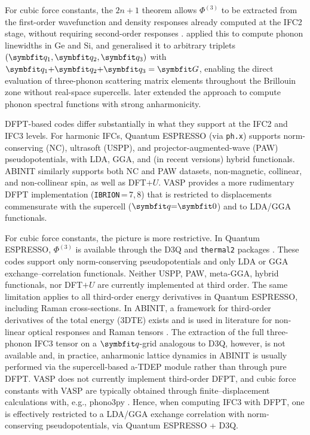 For cubic force constants, the $2n{+}1$ theorem allows $\Phi^{(3)}$
to be extracted from the first-order wavefunction and density
responses already computed at the IFC2 stage, without requiring
second-order responses \cite{debernardi_anharmonic_1995, debernardi_third-order_1994}.
\citet{deinzer_ab_2003} applied this
to compute phonon linewidths in Ge and Si, and
\citet{paulatto_anharmonic_2013} generalised it to arbitrary
triplets $(\vq_1,\vq_2,\vq_3)$ with $\vq_1{+}\vq_2{+}\vq_3 =\vc{G}$,
enabling the direct evaluation of three-phonon scattering matrix
elements throughout the Brillouin zone without real-space
supercells.  \citet{paulatto_first-principles_2015} later extended
the approach to compute phonon spectral functions with strong anharmonicity.

DFPT-based codes differ substantially in what they support at the
IFC2 and IFC3 levels.  For harmonic IFCs, Quantum ESPRESSO
\cite{giannozzi_quantum_2009, giannozzi_advanced_2017} (via
\texttt{ph.x}) supports norm-conserving (NC), ultrasoft (USPP), and
projector-augmented-wave (PAW) pseudopotentials, with LDA, GGA, and
(in recent versions) hybrid functionals. ABINIT
\cite{gonze_abinit_2009} similarly supports both NC and PAW datasets,
non-magnetic, collinear, and non-collinear spin, as well as DFT$+U$.
VASP \cite{kresse_efficient_1996} provides a more rudimentary
DFPT implementation (\texttt{IBRION}\,{=}\,7,\,8) that is restricted
to displacements commensurate with the supercell ($\vq{=}\vc 0$) and
to LDA/GGA functionals.

For cubic force constants, the picture is more restrictive.  In
Quantum ESPRESSO, $\Phi^{(3)}$ is available through the D3Q and
\texttt{thermal2} packages
\cite{paulatto_anharmonic_2013, fugallo_ab_2013}.  These
codes support only norm-conserving pseudopotentials and only LDA or
GGA exchange--correlation functionals. Neither USPP, PAW, meta-GGA,
hybrid functionals, nor DFT$+U$ are currently implemented at third
order.  The same limitation applies to all third-order energy
derivatives in Quantum ESPRESSO, including Raman cross-sections.  In
ABINIT, a framework for third-order derivatives of the total energy
(3DTE) exists and is used in literature for non-linear optical
responses and Raman tensors \cite{veithen_nonlinear_2005, romero_abinit_2020}.
The extraction of the full three-phonon IFC3
tensor on a $\vq$-grid analogous to D3Q, however, is not available and, in
practice, anharmonic lattice dynamics in ABINIT is usually performed via
the supercell-based a-TDEP module \cite{bottin_-tdep_2020} rather than through pure
DFPT.  VASP does not currently implement third-order DFPT, and cubic
force constants with VASP are typically obtained through
finite--displacement calculations with, e.g., phono3py
\cite{togo_distributions_2015}. Hence, when computing IFC3 with DFPT, one is
effectively restricted to a LDA/GGA exchange correlation with
norm-conserving pseudopotentials, via Quantum ESPRESSO + D3Q.

